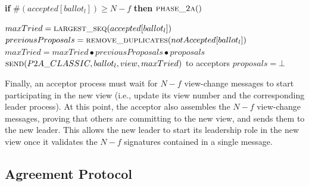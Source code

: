 \begin{algorithm}
\begin{algorithmic}[1]
		\State 
		\State \hspace{\algorithmicindent}\hspace{\algorithmicindent} \textbf{if} $\#(accepted[ballot_l]) \geq N-f$ \textbf{then} 
		\State \hspace{\algorithmicindent}\hspace{\algorithmicindent}\hspace{\algorithmicindent} $\Call{phase\_2a}{ }$
		
		\State
		\State $maxTried = \Call{largest\_seq}{accepted[ballot_l]}$
		\State $previousProposals = \Call{remove\_duplicates}{notAccepted[ballot_l]}$
		\State $maxTried = maxTried \bullet previousProposals \bullet proposals$
		\State $\Call{send}{P2A\_CLASSIC,ballot_l,view, maxTried}$ to acceptors
		\State $proposals = \bot$
		\EndFunction
		
	\end{algorithmic}
\end{algorithm}

Finally, an acceptor process must wait for $N-f$ view-change messages to start participating in the new view (i.e., update its view number and the corresponding leader process). At this point, the acceptor also assembles the $N-f$ view-change messages, proving that others are committing to the new view, and sends them to the new leader. This allows the new leader to start its leadership role in the new view once it validates the $N-f$ signatures contained in a single message.

\subsection{Agreement Protocol} 

